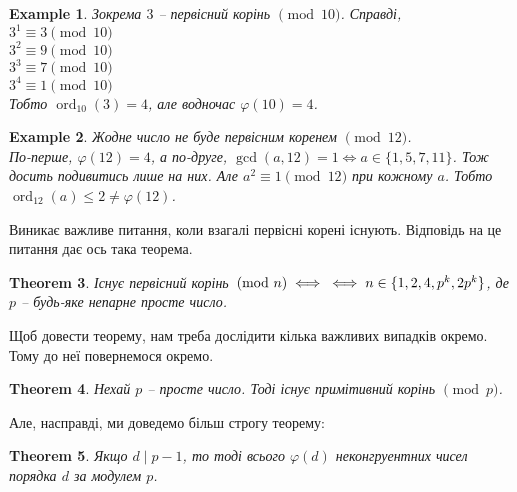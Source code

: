 \documentclass[a4paper, 14pt]{extarticle}
\theoremstyle{theoremdd}
\newtheorem{theorem}{Theorem}[subsection]
\theoremstyle{theoremdd}
\theoremstyle{theoremdd}
\theoremstyle{theoremdd}
\newtheorem{example}[theorem]{Example}
\theoremstyle{theoremdd}
\theoremstyle{theoremdd}
\theoremstyle{theoremdd}
\theoremstyle{theoremdd}
\DeclareMathOperator{\ord}{ord}
\begin{document}
\begin{example}
Зокрема $3$ -- первісний корінь $\!\! \pmod {10}$. Справді,\\
$3^1 \equiv 3 \pmod {10}$\\
$3^2 \equiv 9 \pmod {10}$\\
$3^3 \equiv 7 \pmod {10}$\\
$3^4 \equiv 1 \pmod {10}$\\
Тобто $\ord_{10}(3) = 4$, але водночас $\varphi(10) = 4$.
\end{example}

\begin{example}
Жодне число не буде первісним коренем $\!\! \pmod {12}$.\\
По-перше, $\varphi(12) = 4$, а по-друге, $\gcd(a,12) = 1 \iff a \in \{1,5,7,11\}$. Тож досить подивитись лише на них. Але $a^2 \equiv 1 \pmod {12}$ при кожному $a$. Тобто $\ord_{12}(a) \leq 2 \neq \varphi(12)$.
\end{example}

Виникає важливе питання, коли взагалі первісні корені існують. Відповідь на це питання дає ось така теорема.

\begin{theorem}
\label{primitive_root_exists}
Існує первісний корінь $\!\! \pmod n \iff \\ \iff n \in \{1,2,4,p^k,2p^k\}$, де $p$ -- будь-яке непарне просте число.
\end{theorem}

Щоб довести теорему, нам треба дослідити кілька важливих випадків окремо. Тому до неї повернемося окремо.

\begin{theorem}
\label{primitive root (mod p)}
Нехай $p$ -- просте число. Тоді існує примітивний корінь $\pmod p$.
\end{theorem}

Але, насправді, ми доведемо більш строгу теорему:
\begin{theorem}
Якщо $d \mid p-1$, то тоді всього $\varphi(d)$ неконгруентних чисел порядка $d$ за модулем $p$.
\end{theorem}
\end{document}
